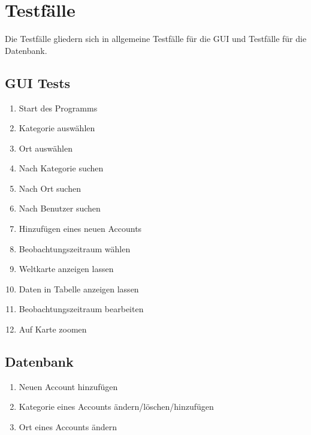 
\section{Testfälle}

Die Testfälle gliedern sich in allgemeine Testfälle für die GUI und Testfälle für die Datenbank.

	\subsection{GUI Tests}
	\begin{enumerate}[align=left, leftmargin=4em, label={\textbf{\textbackslash T10\arabic*0\textbackslash}} ]
	\item Start des Programms
	\item Kategorie auswählen
	\item Ort auswählen
	\item Nach Kategorie suchen
	\item Nach Ort suchen
	\item Nach Benutzer suchen
	\item Hinzufügen eines neuen Accounts
	\item Beobachtungszeitraum wählen
	\item Weltkarte anzeigen lassen
	\item Daten in Tabelle anzeigen lassen
	\item Beobachtungszeitraum bearbeiten
	\item Auf Karte zoomen
	\end{enumerate}
	
	\subsection{Datenbank}
	\begin{enumerate}[align=left, leftmargin=4em, label={\textbf{\textbackslash T20\arabic*0\textbackslash}} ]
		\item Neuen Account hinzufügen
		\item Kategorie eines Accounts ändern/löschen/hinzufügen
		\item Ort eines Accounts ändern
	\end{enumerate}

